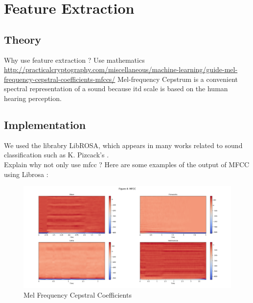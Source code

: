 \documentclass{article} %
\begin{document}
\section{Feature Extraction}

	\subsection{Theory}
		Why use feature extraction ? Use mathematics \url{http://practicalcryptography.com/miscellaneous/machine-learning/guide-mel-frequency-cepstral-coefficients-mfccs/}
		Mel-frequency Cepstrum  is a convenient spectral representation of a sound because itd scale is based on the human hearing perception.

	\subsection{Implementation}
		We used the librabry LibROSA, which appears in many works related to sound classification such as K. Pizcack's \cite{cite2}.\\

		Explain why not only use mfcc ?
		\newline
		Here are some examples of the output of MFCC using Librosa :
		\begin{figure}
		  \includegraphics[width=\linewidth]{mfcc.png}
		  \caption{Mel Frequency Cepstral Coefficients}
		\end{figure}
	
\end{document}
